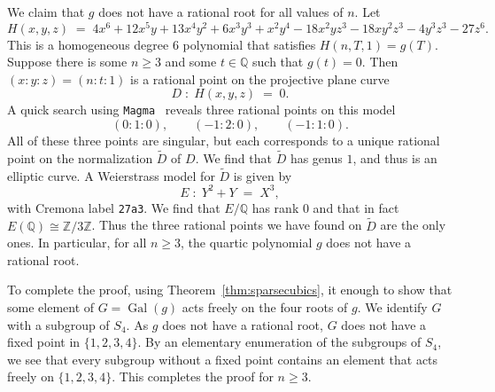 \documentclass{amsart}
\newcommand{\Q}{\mathbb{Q}}
\newcommand{\Z}{\mathbb{Z}}
\DeclareMathOperator{\Gal}{Gal}
\theoremstyle{definition}
\theoremstyle{remark}
\begin{document}
We claim that $g$ does not have a rational root for all values of $n$.
Let
\[
	H(x,y,z) \; = \; 4 x^6 + 12 x^5 y + 13 x^4 y^2 + 6 x^3 y^3 + x^2 y^4 - 18 x^2 y z^3 -
    18 x y^2 z^3 - 4 y^3 z^3 - 27 z^6.
\]
This is a homogeneous degree $6$ polynomial that satisfies
$H(n,T,1)=g(T)$.
Suppose there is some $n \ge 3$ and some $t \in \Q$
such that $g(t)=0$. Then $(x:y:z)=(n:t:1)$ is a rational point on the 
projective plane curve
\[
	D \; : \; 	H(x,y,z) \; = \; 0.
\]
A quick search using \texttt{Magma}~\cite{Magma} reveals three rational points
on this model
\[
(0 : 1 : 0), \qquad
    (-1 : 2 : 0), \qquad
     (-1 : 1 : 0).
\]
All of these three points are singular, but each corresponds to a unique
rational point on the normalization $\tilde{D}$ of $D$.
We find that $\tilde{D}$ has genus $1$, and thus is an elliptic curve.
A Weierstrass model for $\tilde{D}$ is given by
\[
	E \; : \; Y^2 +Y \; = \; X^3,
\]
with Cremona label \texttt{27a3}.
We find that $E/\Q$ has rank $0$ and that  in fact $E(\Q) \cong \Z/3\Z$.
Thus the three rational points we have found on $\tilde{D}$ 
are the only ones. In particular, for all $n \ge 3$, the
quartic polynomial $g$ does not have a rational root. 

To complete the proof, using Theorem~\ref{thm:sparsecubics},
it enough to show that some element of $G=\Gal(g)$ acts freely on the four
roots of $g$. We identify $G$ with a subgroup of $S_4$.
As $g$ does not have a rational root, $G$ does not have a fixed point
in $\{1,2,3,4\}$.
By an elementary enumeration of the subgroups of $S_4$,
we see that every subgroup without a fixed point contains
an element that acts freely on $\{1,2,3,4\}$. This completes the proof for $n \ge 3$.

\end{document}
